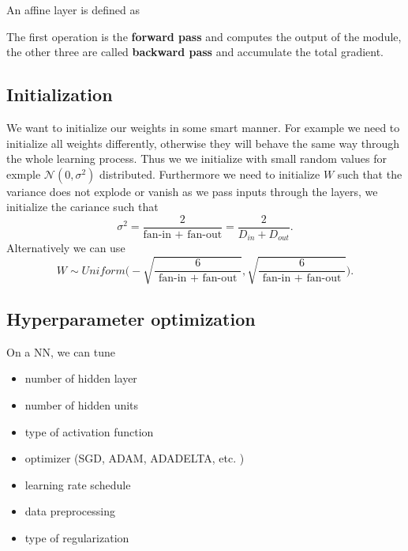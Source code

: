 \documentclass[12 pt]{article}        	%
\begin{document}
\begin{algo}
    An affine layer is defined as 
    \begin{algorithmic}
                            
    \end{algorithmic}
    The first operation is the \textbf{forward pass} and computes the output of the module, the other three are called \textbf{backward pass} and accumulate the total gradient.
\end{algo}

\subsection{Initialization}

We want to initialize our weights in some smart manner.
For example we need to initialize all weights differently, otherwise they will behave the same way through the whole learning process.
Thus we we initialize with small random values for exmple $ \mathcal{ N } ( 0 , \sigma^2 ) $ distributed.
Furthermore we need to initialize $ W $ such that the variance does not explode or vanish as we pass inputs through the layers, we initialize the cariance such that 
\[
    \sigma^2 
    =
    \frac{ 2 }{ \text{fan-in + fan-out} } 
    = 
    \frac{ 2 }{ D_{ in } + D_{ out } }.
\]
Alternatively we can use 
\[
    W \sim Uniform \bigg( - \sqrt{ \frac{ 6 }{ \text{ fan-in + fan-out } } } , \sqrt{ \frac{ 6 }{ \text{ fan-in + fan-out } } } \bigg).
\]

\subsection{Hyperparameter optimization}

On a NN, we can tune
\begin{itemize}
    \item 
    number of hidden layer

    \item 
    number of hidden units

    \item 
    type of activation function

    \item 
    optimizer (SGD, ADAM, ADADELTA, etc. )

    \item 
    learning rate schedule

    \item 
    data preprocessing

    \item 
    type of regularization
\end{itemize}
\end{document}
